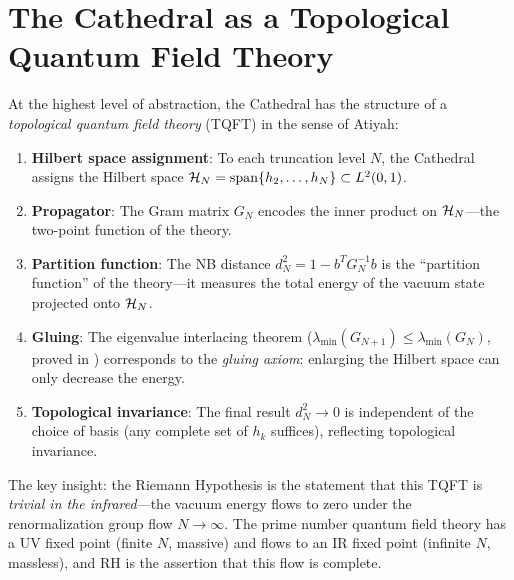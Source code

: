 \documentclass[11pt,a4paper]{article}
\begin{document}
\section{The Cathedral as a Topological Quantum Field Theory}
\label{sec:tqft}

At the highest level of abstraction, the Cathedral has the structure
of a \emph{topological quantum field theory} (TQFT) in the sense
of Atiyah:

\begin{enumerate}
  \item \textbf{Hilbert space assignment}: To each truncation level $N$,
    the Cathedral assigns the Hilbert space
    $\mathcal{H}_N = \operatorname{span}\{h_2, \ldots, h_N\} \subset L^2(0,1)$.

  \item \textbf{Propagator}: The Gram matrix $G_N$ encodes the inner
    product on $\mathcal{H}_N$---the two-point function of the theory.

  \item \textbf{Partition function}: The NB distance $d_N^2 = 1 - b^T G_N^{-1} b$
    is the ``partition function'' of the theory---it measures the total
    energy of the vacuum state projected onto $\mathcal{H}_N$.

  \item \textbf{Gluing}: The eigenvalue interlacing theorem
    ($\lambda_{\min}(G_{N+1}) \leq \lambda_{\min}(G_N)$, proved in
    ) corresponds to the \emph{gluing
    axiom}: enlarging the Hilbert space can only decrease the energy.

  \item \textbf{Topological invariance}: The final result $d_N^2 \to 0$
    is independent of the choice of basis (any complete set of $h_k$
    suffices), reflecting topological invariance.
\end{enumerate}

The key insight: the Riemann Hypothesis is the statement that this
TQFT is \emph{trivial in the infrared}---the vacuum energy flows to
zero under the renormalization group flow $N \to \infty$. The prime
number quantum field theory has a UV fixed point (finite $N$, massive)
and flows to an IR fixed point (infinite $N$, massless), and RH is the
assertion that this flow is complete.

\end{document}
